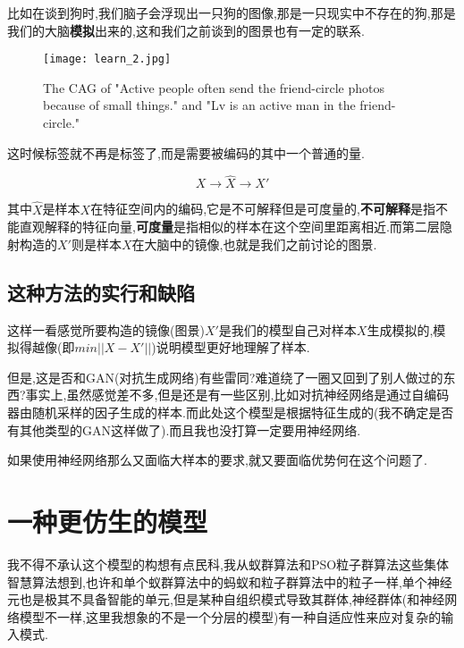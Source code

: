 比如在谈到狗时,我们脑子会浮现出一只狗的图像,那是一只现实中不存在的狗,那是我们的大脑\textbf{模拟}出来的,这和我们之前谈到的图景也有一定的联系.

\begin{figure}[H]
\centering        
\texttt{[image: learn\_2.jpg]}
\caption{The CAG of "Active people often send the friend-circle photos because of small things." and "Lv is an active man in the friend-circle."}      
\end{figure}

这时候标签就不再是标签了,而是需要被编码的其中一个普通的量.

$$X \rightarrow \hat{X} \rightarrow X'$$

其中$\hat{X}$是样本$X$在特征空间内的编码,它是不可解释但是可度量的,\textbf{不可解释}是指不能直观解释的特征向量,\textbf{可度量}是指相似的样本在这个空间里距离相近.而第二层隐射构造的$X'$则是样本$X$在大脑中的镜像,也就是我们之前讨论的图景.


\subsection{这种方法的实行和缺陷}
这样一看感觉所要构造的镜像(图景)$X'$是我们的模型自己对样本$X$生成模拟的,模拟得越像(即$min||X-X'||$)说明模型更好地理解了样本.

但是,这是否和GAN(对抗生成网络)有些雷同?难道绕了一圈又回到了别人做过的东西?事实上,虽然感觉差不多,但是还是有一些区别,比如对抗神经网络是通过自编码器由随机采样的因子生成的样本.而此处这个模型是根据特征生成的(我不确定是否有其他类型的GAN这样做了).而且我也没打算一定要用神经网络.

如果使用神经网络那么又面临大样本的要求,就又要面临优势何在这个问题了.

\section{一种更仿生的模型}
我不得不承认这个模型的构想有点民科,我从蚁群算法和PSO粒子群算法这些集体智慧算法想到,也许和单个蚁群算法中的蚂蚁和粒子群算法中的粒子一样,单个神经元也是极其不具备智能的单元,但是某种自组织模式导致其群体,神经群体(和神经网络模型不一样,这里我想象的不是一个分层的模型)有一种自适应性来应对复杂的输入模式.

